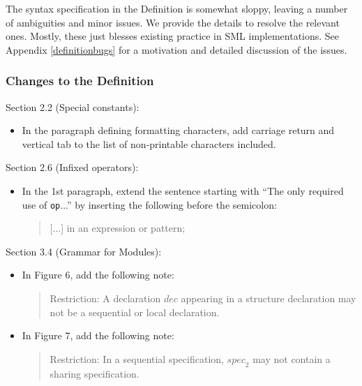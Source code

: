 \documentclass[twoside,titlepage]{article}
\newcommand{\void}[1]{}
\begin{document}
\begin{appendix}
The syntax specification in the Definition is somewhat sloppy, leaving a number of ambiguities and minor issues. We provide the details to resolve the relevant ones. Mostly, these just blesses existing practice in SML implementations. See Appendix \ref{definitionbugs} for a motivation and detailed discussion of the issues.

\subsubsection*{Changes to the Definition}

Section 2.2 (Special constants):
\begin{itemize}
\item In the paragraph defining formatting characters, add carriage return and vertical tab to the list of non-printable characters included.
\end{itemize}

Section 2.6 (Infixed operators):
\begin{itemize}
\item In the 1st paragraph, extend the sentence starting with ``The only required use of {\tt op}...'' by inserting the following before the semicolon:
  \begin{quote}
 [...] in an expression or pattern;
  \end{quote}
\end{itemize}

\void{
Section 2.9 (Syntactic Restrictions):
\begin{itemize}
\item Add the following bullet: 
  \begin{quote}
  Any $\mathit{tyvar}$ occurring on the right side of a $\mathit{typbind}$ or $\mathit{datbind}$ of the form ``$\mathit{tyvarseq}$ $\mathit{tycon}$ {\tt=} \dots'' must occur in $\mathit{tyvarseq}$.
  \end{quote}
\end{itemize}
}

Section 3.4 (Grammar for Modules):
\begin{itemize}
\item In Figure 6, add the following note:
  \begin{quote}
  Restriction: A declaration $\mathit{dec}$ appearing in a structure declaration may not be a sequential or local declaration.
  \end{quote}

\item In Figure 7, add the following note:
  \begin{quote}
  Restriction: In a sequential specification, $\mathit{spec}_2$ may not contain a sharing specification.
  \end{quote}


\end{itemize}
\end{appendix}
\end{document}
